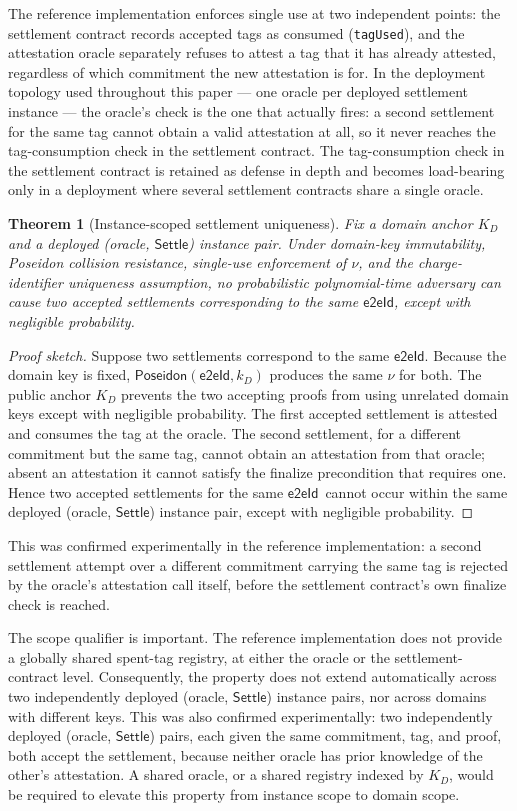 \documentclass[10pt,twocolumn]{article}
\newtheorem{theorem}{Theorem}
\newcommand{\Poseidon}{\ensuremath{\mathsf{Poseidon}}}
\newcommand{\eeid}{\ensuremath{\mathsf{e2eId}}}
\newcommand{\code}[1]{\texttt{#1}}
\newcommand{\Settle}{\ensuremath{\mathsf{Settle}}}
\begin{document}
The reference implementation enforces single use at two independent
points: the settlement contract records accepted tags as consumed
(\code{tagUsed}), and the attestation oracle separately refuses to
attest a tag that it has already attested, regardless of which
commitment the new attestation is for. In the deployment topology used
throughout this paper --- one oracle per deployed settlement instance ---
the oracle's check is the one that actually fires: a second settlement
for the same tag cannot obtain a valid attestation at all, so it never
reaches the tag-consumption check in the settlement contract. The
tag-consumption check in the settlement contract is retained as defense
in depth and becomes load-bearing only in a deployment where several
settlement contracts share a single oracle.

\begin{theorem}[Instance-scoped settlement uniqueness]
\label{thm:instance-scoped}
Fix a domain anchor $K_D$ and a deployed (oracle, \Settle) instance pair.
Under domain-key immutability, Poseidon collision resistance, single-use
enforcement of $\nu$, and the charge-identifier uniqueness assumption, no
probabilistic polynomial-time adversary can cause two accepted
settlements corresponding to the same \eeid, except with negligible
probability.
\end{theorem}

\begin{proof}[Proof sketch]
Suppose two settlements correspond to the same \eeid. Because the domain
key is fixed, $\Poseidon(\eeid,k_D)$ produces the same $\nu$ for both.
The public anchor $K_D$ prevents the two accepting proofs from using
unrelated domain keys except with negligible probability. The first
accepted settlement is attested and consumes the tag at the oracle. The
second settlement, for a different commitment but the same tag, cannot
obtain an attestation from that oracle; absent an attestation it cannot
satisfy the finalize precondition that requires one. Hence two accepted
settlements for the same \eeid\ cannot occur within the same deployed
(oracle, \Settle) instance pair, except with negligible probability.
\end{proof}

This was confirmed experimentally in the reference implementation: a
second settlement attempt over a different commitment carrying the same
tag is rejected by the oracle's attestation call itself, before the
settlement contract's own finalize check is reached.

The scope qualifier is important. The reference implementation does not
provide a globally shared spent-tag registry, at either the oracle or the
settlement-contract level. Consequently, the property does not extend
automatically across two independently deployed (oracle, \Settle)
instance pairs, nor across domains with different keys. This was also
confirmed experimentally: two independently deployed (oracle, \Settle)
pairs, each given the same commitment, tag, and proof, both accept the
settlement, because neither oracle has prior knowledge of the other's
attestation. A shared oracle, or a shared registry indexed by $K_D$,
would be required to elevate this property from instance scope to domain
scope.
\end{document}
